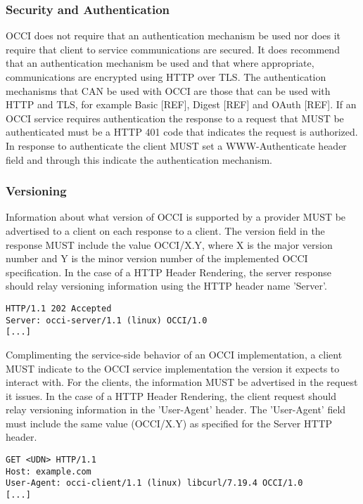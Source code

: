 \documentclass[10pt,a4paper]{article}
\begin{document}
\subsubsection{Security and Authentication}
OCCI does not require that an authentication mechanism be used nor
does it require that client to service communications are secured. It
does recommend that an authentication mechanism be used and that where
appropriate, communications are encrypted using HTTP over TLS. The
authentication mechanisms that CAN be used with OCCI are those that
can be used with HTTP and TLS, for example Basic [REF], Digest [REF]
and OAuth [REF]. If an OCCI service requires authentication the
response to a request that MUST be authenticated must be a HTTP 401
code that indicates the request is authorized. In response to
authenticate the client MUST set a WWW-Authenticate header field and
through this indicate the authentication mechanism.

\subsubsection{Versioning}
Information about what version of OCCI is supported by a provider MUST
be advertised to a client on each response to a client. The version
field in the response MUST include the value OCCI/X.Y, where X is the
major version number and Y is the minor version number of the
implemented OCCI specification. In the case of a HTTP Header
Rendering, the server response should relay versioning information
using the HTTP header name 'Server'.

\begin{verbatim}
HTTP/1.1 202 Accepted
Server: occi-server/1.1 (linux) OCCI/1.0
[...]
\end{verbatim}

Complimenting the service-side behavior of an OCCI implementation, a
client MUST indicate to the OCCI service implementation the version it
expects to interact with. For the clients, the information MUST be
advertised in the request it issues. In the case of a HTTP Header
Rendering, the client request should relay versioning information in
the 'User-Agent' header. The 'User-Agent' field must include the same
value (OCCI/X.Y) as specified for the Server HTTP header.

\begin{verbatim}
GET <UDN> HTTP/1.1
Host: example.com
User-Agent: occi-client/1.1 (linux) libcurl/7.19.4 OCCI/1.0
[...]
\end{verbatim}
\end{document}
